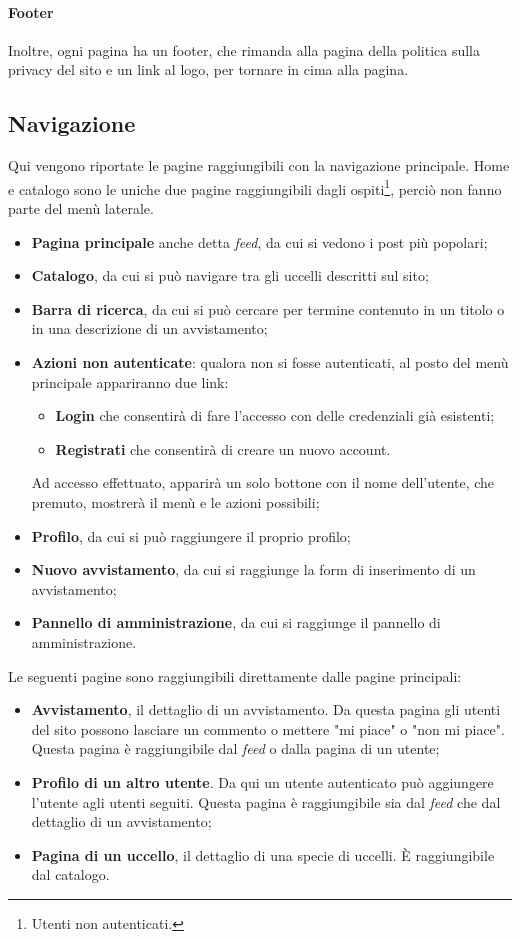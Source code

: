 \documentclass[12pt, a4paper]{article}
\begin{document}
\paragraph{Footer}
Inoltre, ogni pagina ha un footer, che rimanda alla pagina della politica sulla privacy del sito e un link al logo, per tornare in cima alla pagina.
\subsection{Navigazione}
Qui vengono riportate le pagine raggiungibili con la navigazione principale. Home e catalogo sono le uniche due pagine raggiungibili dagli ospiti\footnote{Utenti non autenticati.}, perciò non fanno parte del menù laterale.
\begin{itemize}
\item \textbf{Pagina principale} anche detta \textit{feed}, da cui si vedono i post più popolari;
\item \textbf{Catalogo}, da cui si può navigare tra gli uccelli descritti sul sito; 
\item \textbf{Barra di ricerca}, da cui si può cercare per termine contenuto in un titolo o in una descrizione di un avvistamento;
\item \textbf{Azioni non autenticate}: qualora non si fosse autenticati, al posto del menù principale appariranno due link:
	\begin{itemize}
	\item \textbf{Login} che consentirà di fare l'accesso con delle credenziali già esistenti;
	\item \textbf{Registrati} che consentirà di creare un nuovo account.
	\end{itemize}
	Ad accesso effettuato, apparirà un solo bottone con il nome dell'utente, che premuto, mostrerà il menù e le azioni possibili;
\item \textbf{Profilo}, da cui si può raggiungere il proprio profilo;
\item \textbf{Nuovo avvistamento}, da cui si raggiunge la form di inserimento di un avvistamento;
\item \textbf{Pannello di amministrazione}, da cui si raggiunge il pannello di amministrazione.
\end{itemize}
Le seguenti pagine sono raggiungibili direttamente dalle pagine principali:
\begin{itemize}
\item \textbf{Avvistamento}, il dettaglio di un avvistamento. Da questa pagina gli utenti del sito possono lasciare un commento o mettere "mi piace" o "non mi piace". Questa pagina è raggiungibile dal \textit{feed} o dalla pagina di un utente;
\item \textbf{Profilo di un altro utente}. Da qui un utente autenticato può aggiungere l'utente agli utenti seguiti. Questa pagina è raggiungibile sia dal \textit{feed} che dal dettaglio di un avvistamento;
\item \textbf{Pagina di un uccello}, il dettaglio di una specie di uccelli. È raggiungibile dal catalogo.
\end{itemize}
\end{document}
